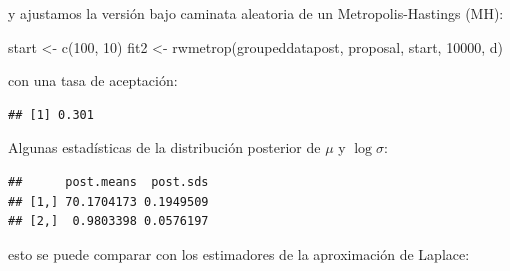 \documentclass[
  12pt,
]{book}
\newenvironment{Shaded}{\begin{snugshade}}{\end{snugshade}}
\newcommand{\DecValTok}[1]{\textcolor[rgb]{0.00,0.00,0.81}{#1}}
\newcommand{\FunctionTok}[1]{\textcolor[rgb]{0.00,0.00,0.00}{#1}}
\newcommand{\NormalTok}[1]{#1}
\newcommand{\OtherTok}[1]{\textcolor[rgb]{0.56,0.35,0.01}{#1}}
\newcommand{\SpecialCharTok}[1]{\textcolor[rgb]{0.00,0.00,0.00}{#1}}
\theoremstyle{definition}
\theoremstyle{definition}
\theoremstyle{definition}
\theoremstyle{definition}
\theoremstyle{remark}
\begin{document}
y ajustamos la versión bajo caminata aleatoria de un Metropolis-Hastings (MH):

\begin{Shaded}
\begin{Highlighting}[]
\NormalTok{start }\OtherTok{\textless{}{-}} \FunctionTok{c}\NormalTok{(}\DecValTok{100}\NormalTok{, }\DecValTok{10}\NormalTok{)}
\NormalTok{fit2 }\OtherTok{\textless{}{-}} \FunctionTok{rwmetrop}\NormalTok{(groupeddatapost, proposal, start,}
    \DecValTok{10000}\NormalTok{, d)}
\end{Highlighting}
\end{Shaded}

con una tasa de aceptación:

\begin{Shaded}
\end{Shaded}

\begin{verbatim}
## [1] 0.301
\end{verbatim}

Algunas estadísticas de la distribución posterior de \(\mu\) y \(\log \sigma\):

\begin{Shaded}
\end{Shaded}

\begin{verbatim}
##      post.means  post.sds
## [1,] 70.1704173 0.1949509
## [2,]  0.9803398 0.0576197
\end{verbatim}

esto se puede comparar con los estimadores de la aproximación de Laplace:

\begin{Shaded}
\end{Shaded}
\end{document}
